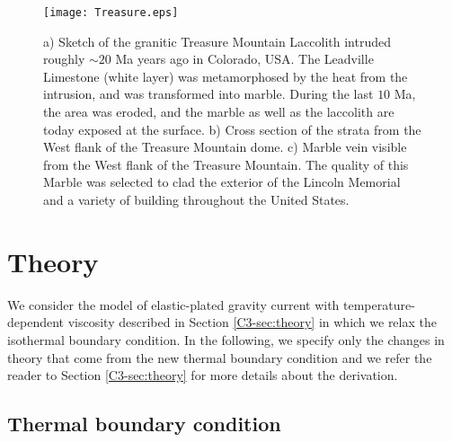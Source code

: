 \begin{figure}[h!]
  \begin{center}
    \graphicspath{ {/Users/thorey/Documents/These/Manuscript/Figure/Chapter4/} }
    \texttt{[image: Treasure.eps]}
    \caption{a)  Sketch of  the granitic  Treasure Mountain  Laccolith
      intruded roughly  $\sim 20$ Ma  years ago in Colorado,  USA. The
      Leadville Limestone (white layer)  was metamorphosed by the heat
      from the intrusion, and was transformed into marble.  During the
      last $10$ Ma, the area was eroded, and the marble as well as the
      laccolith are today exposed at the surface.  b) Cross section of
      the strata from the West flank of the Treasure Mountain dome. c)
      Marble  vein  visible  from  the  West  flank  of  the  Treasure
      Mountain. The  quality of this  Marble was selected to  clad the
      exterior  of the  Lincoln  Memorial and  a  variety of  building
      throughout the United States.}
    \label{Treasure}
  \end{center}
\end{figure}
\newpage
\section{Theory}
\label{C4-sec:theory-1}

We  consider   the  model  of  elastic-plated   gravity  current  with
temperature-dependent      viscosity     described      in     Section
\ref{C3-sec:theory}  in   which  we  relax  the   isothermal  boundary
condition. In  the following,  we specify only  the changes  in theory
that come  from the new  thermal boundary  condition and we  refer the
reader  to  Section \ref{C3-sec:theory}  for  more  details about  the
derivation.

\subsection{Thermal boundary condition}
\label{C4-sec:formulation-1}

